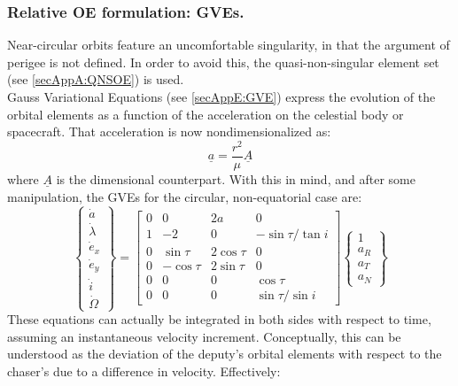 		\subsubsection{Relative OE formulation: GVEs.}
		\indent Near-circular orbits feature an uncomfortable singularity, in that the argument of perigee is not defined. In order to avoid this, the quasi-non-singular element set (see \ref{secAppA:QNSOE}) is used.\\
		\indent Gauss Variational Equations (see \ref{secAppE:GVE}) express the evolution of the orbital elements as a function of the acceleration on the celestial body or spacecraft. That acceleration is now nondimensionalized as:
		\begin{equation}
		\underline{a} =  \dfrac{r^2}{\mu} \underline{A}
		\end{equation}
		\noindent where $\underline{A}$ is the dimensional counterpart. With this in mind, and after some manipulation, the GVEs for the circular, non-equatorial case are:
		\begin{equation}
		\left\{\begin{array}{c}
		\dot{a} \\
		\dot{\lambda} \\
		\dot{e}_x \\
		\dot{e}_y \\
		\dot{i} \\
		\dot{\Omega}
		\end{array}\right\} =\left[\begin{array}{cccc}
		0 & 0 & 2 a & 0 \\
		1 & -2 & 0 & -\sin \tau / \tan i \\
		0 & \sin \tau & 2 \cos \tau & 0 \\
		0 & -\cos \tau & 2 \sin \tau & 0 \\
		0 & 0 & 0 & \cos \tau \\
		0 & 0 & 0 & \sin \tau / \sin i
		\end{array}\right] \left\{\begin{array}{c}
		1 \\
		a_R \\
		a_T \\
		a_N
		\end{array}\right\}
		\end{equation}
		\indent These equations can actually be integrated in both sides with respect to time, assuming an instantaneous velocity increment. Conceptually, this can be understood as the deviation of the deputy's orbital elements with respect to the chaser's due to a difference in velocity. Effectively:
